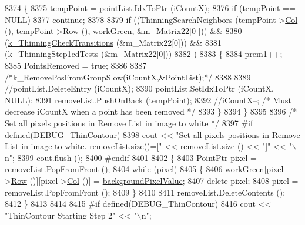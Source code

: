 \begin{DoxyCode}
8374     \{
8375       tempPoint = pointList.IdxToPtr (iCountX);
8376       \textcolor{keywordflow}{if}  (tempPoint == NULL)
8377         \textcolor{keywordflow}{continue};
8378       
8379       \textcolor{keywordflow}{if}  ((ThinningSearchNeighbors  (tempPoint->\hyperlink{class_k_k_b_1_1_point_afb196b03757fc697f6ade0129a1c7fcf}{Col} (), tempPoint->\hyperlink{class_k_k_b_1_1_point_abfc34bcf809fc9fb95baf5c745b07549}{Row} (),  workGreen, &m\_Matrix22[0
      ]))  &&
8380            (\hyperlink{_raster_8cpp_a26369c862acddcbd9e8b1eb2913adb20}{k\_ThinningCheckTransitions} (&m\_Matrix22[0]))                         
                                 &&
8381            (\hyperlink{_raster_8cpp_a18dbacc13d461016bbced3e8c9973757}{k\_ThinningStep1cdTests}     (&m\_Matrix22[0]))
8382           )
8383       \{
8384         prem1++;
8385         PointsRemoved = \textcolor{keyword}{true};
8386         
8387         \textcolor{comment}{/*k\_RemovePosFromGroupSlow(iCountX,&PointList);*/}
8388 
8389         \textcolor{comment}{//pointList.DeleteEntry (iCountX);}
8390         pointList.SetIdxToPtr (iCountX, NULL);
8391         removeList.PushOnBack (tempPoint);
8392         \textcolor{comment}{//iCountX--;  /* Must decrease iCountX when a point has been removed */}
8393       \}
8394     \}
8395     
8396     \textcolor{comment}{/* Set all pixels positions in Remove List in image to white */}
8397 \textcolor{preprocessor}{    #if  defined(DEBUG\_ThinContour)}
8398       cout << \textcolor{stringliteral}{"Set all pixels positions in Remove List in image to white.   removeList.size()=["} << 
      removeList.size () << \textcolor{stringliteral}{"]"} << \textcolor{stringliteral}{"\(\backslash\)n"};
8399       cout.flush ();
8400 \textcolor{preprocessor}{    #endif}
8401 
8402     \{
8403       \hyperlink{class_k_k_b_1_1_point}{PointPtr}  pixel = removeList.PopFromFront ();
8404       \textcolor{keywordflow}{while}  (pixel)
8405       \{
8406         workGreen[pixel->\hyperlink{class_k_k_b_1_1_point_abfc34bcf809fc9fb95baf5c745b07549}{Row} ()][pixel->\hyperlink{class_k_k_b_1_1_point_afb196b03757fc697f6ade0129a1c7fcf}{Col} ()] = \hyperlink{class_k_k_b_1_1_raster_ab7ed2191cce116a6a37029dc6e3713ef}{backgroundPixelValue};
8407         \textcolor{keyword}{delete} pixel;
8408         pixel = removeList.PopFromFront ();
8409       \}
8410 
8411       removeList.DeleteContents ();
8412     \}
8413 
8414 
8415 \textcolor{preprocessor}{    #if  defined(DEBUG\_ThinContour)}
8416       cout << \textcolor{stringliteral}{"ThinContour  Starting Step 2"} << \textcolor{stringliteral}{"\(\backslash\)n"};

\end{DoxyCode}

